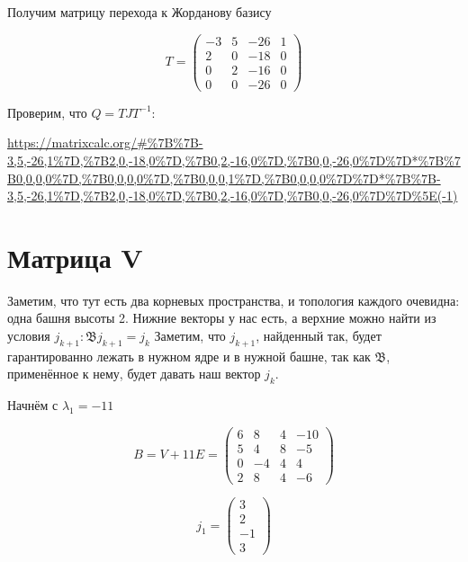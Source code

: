 \documentclass[12pt, a4paper]{article}
\begin{document}
    Получим матрицу перехода к Жорданову базису

    \begin{equation}
        T = \left(\begin{matrix}
            -3 & 5 & -26 & 1 \\
            2 & 0 & -18 & 0 \\
            0 & 2 & -16 & 0 \\
            0 & 0 & -26 & 0
        \end{matrix}\right)
    \end{equation}

    Проверим, что $Q = T J T^{-1}$:

    \url{https://matrixcalc.org/#%7B%7B-3,5,-26,1%7D,%7B2,0,-18,0%7D,%7B0,2,-16,0%7D,%7B0,0,-26,0%7D%7D*%7B%7B0,0,0,0%7D,%7B0,0,0,0%7D,%7B0,0,0,1%7D,%7B0,0,0,0%7D%7D*%7B%7B-3,5,-26,1%7D,%7B2,0,-18,0%7D,%7B0,2,-16,0%7D,%7B0,0,-26,0%7D%7D%5E(-1)}



    \section{Матрица V}
    
    Заметим, что тут есть два корневых пространства, и топология каждого очевидна: одна башня высоты 2.
    Нижние векторы у нас есть, а верхние можно найти из условия $j_{k + 1}: \mathfrak{B} j_{k + 1} = j_{k}$ 
    Заметим, что $j_{k + 1}$, найденный так, будет гарантированно лежать в нужном ядре и в нужной башне, так как $\mathfrak{B}$, применённое к нему, будет давать наш вектор $j_{k}$.

    Начнём с $\lambda_1 = -11$

    \begin{equation}
        B = V + 11E = \left(\begin{matrix}
            6 & 8 & 4 & -10 \\
            5 & 4 & 8 & -5 \\
            0 & -4 & 4 & 4 \\
            2 & 8 & 4 & -6
        \end{matrix}\right)
    \end{equation}

    \begin{equation}
        j_1 = \begin{pmatrix}
            3 \\ 2 \\ -1 \\ 3
        \end{pmatrix}
    \end{equation}
    
\end{document}
